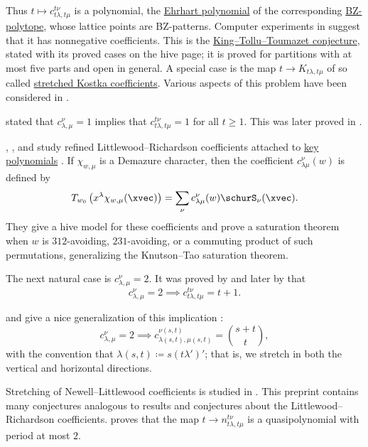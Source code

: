 Thus $t\mapsto c^{t\nu}_{t\lambda,t\mu}$ is a polynomial, the
\hyperref[ehrhartPolynomialDefinition]{Ehrhart polynomial} of the
corresponding \hyperref[bzPatterns]{BZ-polytope}, whose lattice points are
BZ-patterns.  Computer experiments in \cite{KingTolluToumazet2004} suggest
that it has nonnegative coefficients.  This is the
\hyperref[kingTolluToumazetConjecture]{King--Tollu--Toumazet conjecture},
stated with its proved cases on the hive page; it is proved for partitions
with at most five parts \cite[Thm.~2]{Ferudun2026x} and open in general.
A special case is the map $t \to K_{t\lambda,t\mu}$
of so called \hyperref[kostkaStretched]{stretched Kostka coefficients}.
Various aspects of this problem have been considered in
\cite{Alexandersson2016GTPoly,Alexandersson2019CounterExamples}.

\label{fultonsConjecture} stated that
$c^{\nu}_{\lambda,\mu}=1$ implies that $c^{t \nu}_{t\lambda,t\mu}=1$ for all
$t \geq 1$.  This was later proved in \cite{KnutsonTaoWoodward2004}.

,
, and
study refined Littlewood--Richardson coefficients attached to
\hyperref[key]{key polynomials} \cite{KushwahaRaghavanViswanath2021}.
If $\chi_{w,\mu}$ is a Demazure character, then the coefficient
$c^\nu_{\lambda\mu}(w)$ is defined by
\[
T_{w_0}\left(x^\lambda \chi_{w,\mu}(\xvec)\right)
= \sum_\nu c^\nu_{\lambda\mu}(w)\schurS_\nu(\xvec).
\]
They give a hive model for these coefficients and prove a saturation theorem
when $w$ is $312$-avoiding, $231$-avoiding, or a commuting product of such
permutations, generalizing the Knutson--Tao saturation theorem.

The next natural case is $c^{\nu}_{\lambda,\mu}=2$.
It was proved by  \cite{Ikenmeyer2016} and later by
 \cite{Sherman2015x,Sherman2017} that
\[
c^{\nu}_{\lambda,\mu}=2 \implies c^{t \nu}_{t\lambda,t\mu}=t+1.
\]

 and  give a nice
generalization of this implication \cite{ChaputRessayre2025}:
\[
c^{\nu}_{\lambda,\mu}=2 \implies c^{\nu(s,t)}_{\lambda(s,t),\mu(s,t)}=\binom{s+t}{t},
\]
with the convention that $\lambda(s,t) \coloneqq s (t \lambda')'$; that is,
we stretch in both the vertical and horizontal directions.


Stretching of Newell--Littlewood coefficients is studied in \cite{King2021x}.
This preprint contains many conjectures analogous to results and conjectures
about the Littlewood--Richardson coefficients.   proves
that the map $t \to n^{t \nu}_{t\lambda,t\mu}$ is a quasipolynomial with
period at most $2$.


